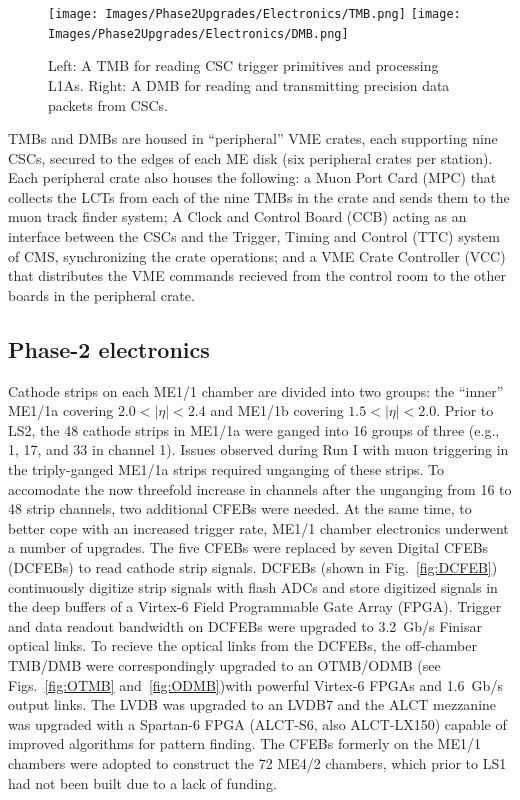 \begin{figure}[H]
    \centering
    {\texttt{[image: Images/Phase2Upgrades/Electronics/TMB.png]}}
    {\texttt{[image: Images/Phase2Upgrades/Electronics/DMB.png]}}
    \caption{Left: A TMB for reading CSC trigger primitives and processing L1As. Right: A DMB for reading and transmitting precision data packets from CSCs.}
    \label{fig:TMBDMB}
\end{figure}

TMBs and DMBs are housed in ``peripheral'' VME crates, each supporting nine CSCs, secured to the edges of each ME disk (six peripheral crates per station). Each peripheral crate also houses the following: a Muon Port Card (MPC) that collects the LCTs from each of the nine TMBs in the crate and sends them to the muon track finder system; A Clock and Control Board (CCB) acting as an interface between the CSCs and the Trigger, Timing and Control (TTC) system of CMS, synchronizing the crate operations; and a VME Crate Controller (VCC) that distributes the VME commands recieved from the control room to the other boards in the peripheral crate.

\subsection{Phase-2 electronics} \label{sec:Phase2CSCelectronics}

Cathode strips on each ME1/1 chamber are divided into two groups: the ``inner'' ME1/1a covering $2.0 < |\eta|< 2.4$ and ME1/1b covering $1.5 < |\eta| < 2.0$. Prior to LS2, the 48 cathode strips in ME1/1a were ganged into 16 groups of three (e.g., 1, 17, and 33 in channel 1). Issues observed during Run I with muon triggering in the triply-ganged ME1/1a strips required unganging of these strips. To accomodate the now threefold increase in channels after the unganging from 16 to 48 strip channels, two additional CFEBs were needed. At the same time, to better cope with an increased trigger rate, ME1/1 chamber electronics underwent a number of upgrades. The five CFEBs were replaced by seven Digital CFEBs (DCFEBs) to read cathode strip signals. DCFEBs (shown in Fig.~\ref{fig:DCFEB}) continuously digitize strip signals with flash ADCs and store digitized signals in the deep buffers of a Virtex-6 Field Programmable Gate Array (FPGA). Trigger and data readout bandwidth on DCFEBs were upgraded to \SI{3.2}{Gb/s} Finisar optical links. To recieve the optical links from the DCFEBs, the off-chamber TMB/DMB were correspondingly upgraded to an OTMB/ODMB (see Figs.~\ref{fig:OTMB} and~\ref{fig:ODMB})with powerful Virtex-6 FPGAs and \SI{1.6}{Gb/s} output links. The LVDB was upgraded to an LVDB7 and the ALCT mezzanine was upgraded with a Spartan-6 FPGA (ALCT-S6, also ALCT-LX150) capable of improved algorithms for pattern finding. The CFEBs formerly on the ME1/1 chambers were adopted to construct the 72 ME4/2 chambers, which prior to LS1 had not been built due to a lack of funding.


